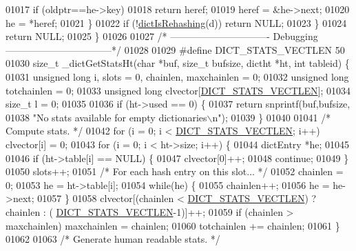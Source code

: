 \begin{DoxyCode}
01017             \textcolor{keywordflow}{if} (oldptr==he->key)
01018                 \textcolor{keywordflow}{return} heref;
01019             heref = &he->next;
01020             he = *heref;
01021         \}
01022         \textcolor{keywordflow}{if} (!\hyperlink{dict_8h_aa6e4917a6a32fdf47180e03ed8969e02}{dictIsRehashing}(d)) \textcolor{keywordflow}{return} NULL;
01023     \}
01024     \textcolor{keywordflow}{return} NULL;
01025 \}
01026 
01027 \textcolor{comment}{/* ------------------------------- Debugging ---------------------------------*/}
01028 
01029 \textcolor{preprocessor}{#}\textcolor{preprocessor}{define} \textcolor{preprocessor}{DICT\_STATS\_VECTLEN} 50
01030 size\_t \_dictGetStatsHt(\textcolor{keywordtype}{char} *buf, size\_t bufsize, dictht *ht, \textcolor{keywordtype}{int} tableid) \{
01031     \textcolor{keywordtype}{unsigned} \textcolor{keywordtype}{long} i, slots = 0, chainlen, maxchainlen = 0;
01032     \textcolor{keywordtype}{unsigned} \textcolor{keywordtype}{long} totchainlen = 0;
01033     \textcolor{keywordtype}{unsigned} \textcolor{keywordtype}{long} clvector[\hyperlink{dict_8c_a6c5f3134060f1ca17b2371b4271bbe64}{DICT\_STATS\_VECTLEN}];
01034     size\_t l = 0;
01035 
01036     \textcolor{keywordflow}{if} (ht->used == 0) \{
01037         \textcolor{keywordflow}{return} snprintf(buf,bufsize,
01038             \textcolor{stringliteral}{"No stats available for empty dictionaries\(\backslash\)n"});
01039     \}
01040 
01041     \textcolor{comment}{/* Compute stats. */}
01042     \textcolor{keywordflow}{for} (i = 0; i < \hyperlink{dict_8c_a6c5f3134060f1ca17b2371b4271bbe64}{DICT\_STATS\_VECTLEN}; i++) clvector[i] = 0;
01043     \textcolor{keywordflow}{for} (i = 0; i < ht->size; i++) \{
01044         dictEntry *he;
01045 
01046         \textcolor{keywordflow}{if} (ht->table[i] == NULL) \{
01047             clvector[0]++;
01048             \textcolor{keywordflow}{continue};
01049         \}
01050         slots++;
01051         \textcolor{comment}{/* For each hash entry on this slot... */}
01052         chainlen = 0;
01053         he = ht->table[i];
01054         \textcolor{keywordflow}{while}(he) \{
01055             chainlen++;
01056             he = he->next;
01057         \}
01058         clvector[(chainlen < \hyperlink{dict_8c_a6c5f3134060f1ca17b2371b4271bbe64}{DICT\_STATS\_VECTLEN}) ? chainlen : (
      \hyperlink{dict_8c_a6c5f3134060f1ca17b2371b4271bbe64}{DICT\_STATS\_VECTLEN}-1)]++;
01059         \textcolor{keywordflow}{if} (chainlen > maxchainlen) maxchainlen = chainlen;
01060         totchainlen += chainlen;
01061     \}
01062 
01063     \textcolor{comment}{/* Generate human readable stats. */}

\end{DoxyCode}
